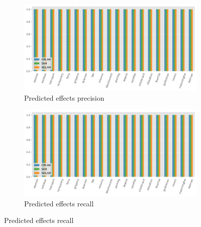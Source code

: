 \begin{figure}[ht]
  \begin{subfigure}[b]{0.45\textwidth}
    \includegraphics[width=\textwidth]{figures/10_traces/predeffs_precision.png}
    \caption{Predicted effects precision}
  \end{subfigure}
  \hfill
  \begin{subfigure}[b]{0.45\textwidth}
    \includegraphics[width=\textwidth]{figures/10_traces/predeffs_recall.png}
    \caption{Predicted effects recall}
  \end{subfigure}

  \vspace{1em}


\end{figure}
